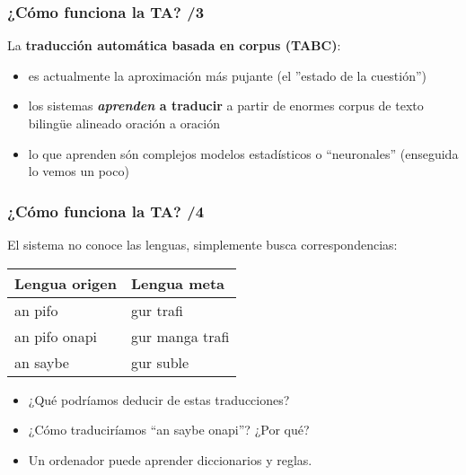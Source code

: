 \documentclass{beamer}
\begin{document}
\begin{frame}
  \frametitle{¿Cómo funciona la TA? /3}
La \textbf{traducción automática basada en corpus (TABC)}:
  \begin{itemize}
  \item es actualmente la aproximación más pujante (el ''estado de la
    cuestión'')
  \item los sistemas \textbf{\emph{aprenden} a traducir} a partir de enormes
    corpus de texto bilingüe alineado oración a oración
  \item lo que aprenden són complejos modelos estadísticos o
    ``neuronales'' (enseguida lo vemos un poco)
  \end{itemize}
\end{frame}


\begin{frame}
\frametitle{¿Cómo funciona la TA? /4}
El sistema no conoce las lenguas, simplemente busca correspondencias:
\begin{center}
  \begin{tabular}{l|l}
  \textbf{Lengua origen} & \textbf{Lengua meta} \\
  \hline
  an pifo & gur trafi \\
  an pifo onapi & gur manga trafi \\
  an saybe & gur suble \\
  \end{tabular}
\end{center}
\begin{itemize}
\item ¿Qué podríamos deducir de estas traducciones?
\item ¿Cómo traduciríamos ``an saybe onapi''? ¿Por qué?
\item Un ordenador puede aprender diccionarios y reglas.
\end{itemize}
\end{frame}
\end{document}
